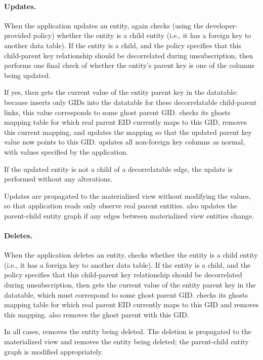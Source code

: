 \paragraph{Updates.}
When the application updates an entity, \sys{} again checks (using the developer-provided policy) whether
the entity is a child entity (i.e., it has a foreign key to another data table). 
If the entity is a child, and the policy specifies that this child-parent key
relationship should be decorrelated during unsubscription, then \sys{} performs one final check of
whether the entity's parent key is one of the columns being updated.

If yes, then \sys{} gets the current value of the entity parent key in the datatable: because \sys{}
inserts only GIDs into the datatable for these decorrelatable child-parent links, this value 
corresponds to some ghost parent GID.
\sys{} checks its ghosts mapping table for which real parent EID currently maps to this GID, removes
this current mapping, and updates the mapping so that the updated parent key value now points to
this GID.
\sys{} updates all non-foreign key columns as normal, with values specified by the application.

If the updated entity is not a child of a decorrelatable edge, the update is performed without any
alterations.

Updates are propagated to the materialized view without modifying the values, so that application
reads only observe real parent entities.
\sys{} also updates the parent-child entity graph if any edges between materialized view entities change.

\paragraph{Deletes.}
When the application deletes an entity, \sys{} checks whether
the entity is a child entity (i.e., it has a foreign key to another data table). 
If the entity is a child, and the policy specifies that this child-parent key
relationship should be decorrelated during unsubscription, then \sys{} gets the current value of the
entity parent key in the datatable, which must correspond to some ghost parent GID.
\sys{} checks its ghosts mapping table for which real parent EID currently maps to this GID and removes
this mapping. \sys{} also removes the ghost parent with this GID.

In all cases, \sys{} removes the entity being deleted.
The deletion is propagated to the materialized view and removes the entity being deleted; the
parent-child entity graph is modified appropriately.

